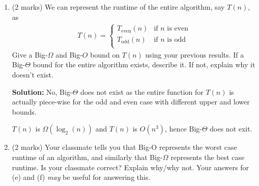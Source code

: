 \documentclass[a4,13pt]{extarticle}
\newenvironment{Solution}{\color{blue}\textbf{Solution:}}{}
\begin{document}
\begin{enumerate}
\begin{enumerate}
	      	      Give a Big-O bound on the \textbf{best case} running time of the algorithm, and a Big-$\Omega$ bound on 
	      	      the \textbf{worst case} running time of the algorithm (and state which parity of the input corresponds with which case).
	        \begin{Solution}
	        \begin{align*}
	      	      	T(n)=\begin{cases}
	      	      	T_{\text{even}}(n) & \text{if $n$ is even, worst case with $O(n^3)$.} \\
	      	      	T_{\text{odd}}(n)  & \text{if $n$ is odd best case with $\Omega(\log_2(n))$.}\\
	      	      	\end{cases}
	      	      \end{align*}
	      	\end{Solution}
	      	      	      \newpage
	      	\item (2 marks) We can represent the runtime of the entire algorithm, say $T(n)$, as
	      	      \begin{align*}
	      	      	T(n)=\begin{cases}
	      	      	T_{\text{even}}(n) & \text{if $n$ is even} \\
	      	      	T_{\text{odd}}(n)  & \text{if $n$ is odd}  \\
	      	      	\end{cases}
	      	      \end{align*}
	      	      Give a Big-$\Omega$ and Big-$O$ bound on $T(n)$ using your previous results. If a Big-$\Theta$ bound for the entire algorithm exists, describe it. If not, explain why it doesn’t exist.
	      	      
	      	\begin{Solution}
	      	No, Big-$\Theta$ does not exist as the entire function for $T(n)$ is actually piece-wise for the odd and even case with different upper and lower bounds.
	      	
	      	$T(n)$ is $\Omega(\log_2(n))$ and $T(n)$ is $O(n^3)$, hence Big-$\Theta$ does not exit.
	      	\end{Solution}
	      	      	      	                  
	      	\item (2 marks) Your classmate tells you that Big-O represents the worst case runtime of an algorithm, and similarly that 
	      	      Big-$\Omega$ represents the best case runtime. Is your classmate correct? Explain why/why not. 
	      	      Your answers for (e) and (f) \textit{may} be useful for answering this.
	      	      

\end{enumerate}
\end{enumerate}
\end{document}
